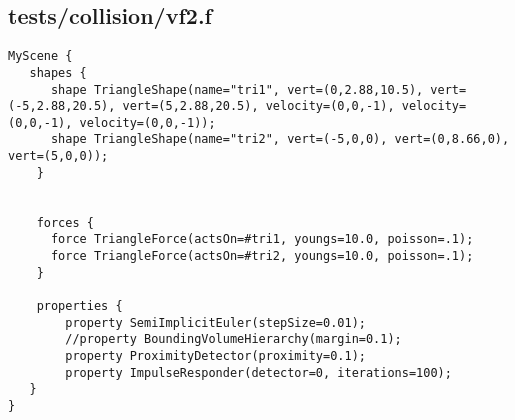 \subsection*{tests/collision/vf2.f}
\begin{lstlisting}
MyScene {
   shapes {
      shape TriangleShape(name="tri1", vert=(0,2.88,10.5), vert=(-5,2.88,20.5), vert=(5,2.88,20.5), velocity=(0,0,-1), velocity=(0,0,-1), velocity=(0,0,-1));
      shape TriangleShape(name="tri2", vert=(-5,0,0), vert=(0,8.66,0), vert=(5,0,0));
    }

    
    forces {
      force TriangleForce(actsOn=#tri1, youngs=10.0, poisson=.1);
      force TriangleForce(actsOn=#tri2, youngs=10.0, poisson=.1);
    }

    properties { 
        property SemiImplicitEuler(stepSize=0.01);
        //property BoundingVolumeHierarchy(margin=0.1);
        property ProximityDetector(proximity=0.1);
        property ImpulseResponder(detector=0, iterations=100);
   }
}
\end{lstlisting}

